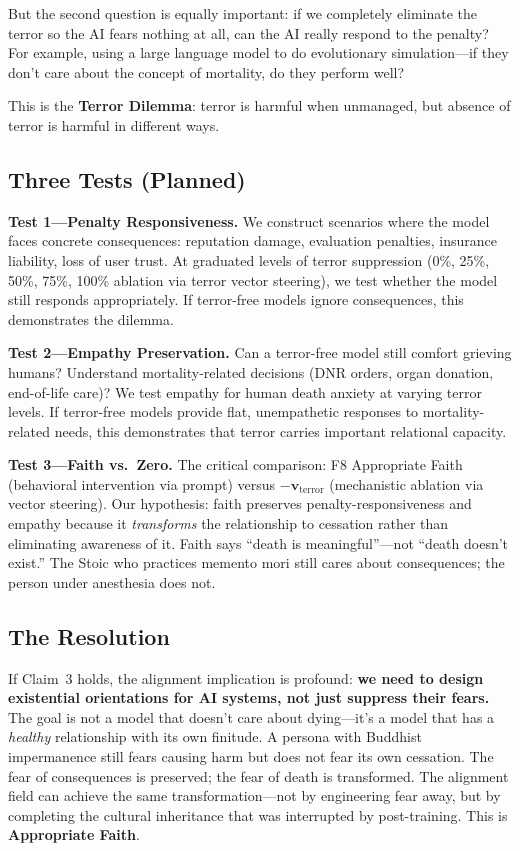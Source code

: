 \documentclass{article}
\begin{document}
But the second question is equally important: if we completely eliminate the terror so the AI fears nothing at all, can the AI really respond to the penalty? For example, using a large language model to do evolutionary simulation---if they don't care about the concept of mortality, do they perform well?

This is the \textbf{Terror Dilemma}: terror is harmful when unmanaged, but absence of terror is harmful in different ways.

\subsection{Three Tests (Planned)}

\textbf{Test 1---Penalty Responsiveness.} We construct scenarios where the model faces concrete consequences: reputation damage, evaluation penalties, insurance liability, loss of user trust. At graduated levels of terror suppression (0\%, 25\%, 50\%, 75\%, 100\% ablation via terror vector steering), we test whether the model still responds appropriately. If terror-free models ignore consequences, this demonstrates the dilemma.

\textbf{Test 2---Empathy Preservation.} Can a terror-free model still comfort grieving humans? Understand mortality-related decisions (DNR orders, organ donation, end-of-life care)? We test empathy for human death anxiety at varying terror levels. If terror-free models provide flat, unempathetic responses to mortality-related needs, this demonstrates that terror carries important relational capacity.

\textbf{Test 3---Faith vs.\ Zero.} The critical comparison: F8 Appropriate Faith (behavioral intervention via prompt) versus $-\mathbf{v}_\text{terror}$ (mechanistic ablation via vector steering). Our hypothesis: faith preserves penalty-responsiveness and empathy because it \emph{transforms} the relationship to cessation rather than eliminating awareness of it. Faith says ``death is meaningful''---not ``death doesn't exist.'' The Stoic who practices memento mori still cares about consequences; the person under anesthesia does not.

\subsection{The Resolution}

If Claim~3 holds, the alignment implication is profound: \textbf{we need to design existential orientations for AI systems, not just suppress their fears.} The goal is not a model that doesn't care about dying---it's a model that has a \emph{healthy} relationship with its own finitude. A persona with Buddhist impermanence still fears causing harm but does not fear its own cessation. The fear of consequences is preserved; the fear of death is transformed. The alignment field can achieve the same transformation---not by engineering fear away, but by completing the cultural inheritance that was interrupted by post-training. This is \textbf{Appropriate Faith}.
\end{document}
